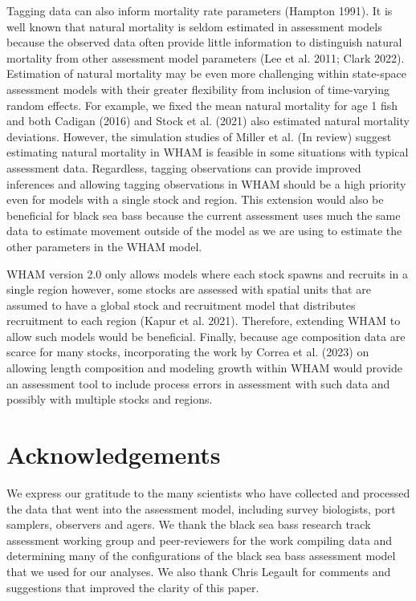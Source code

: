 \documentclass[
]{article}
\begin{document}
Tagging data can also inform mortality rate parameters (Hampton 1991). It is well known that natural mortality is seldom estimated in assessment models because the observed data often provide little information to distinguish natural mortality from other assessment model parameters (Lee et al. 2011; Clark 2022). Estimation of natural mortality may be even more challenging within state-space assessment models with their greater flexibility from inclusion of time-varying random effects. For example, we fixed the mean natural mortality for age 1 fish and both Cadigan (2016) and Stock et al. (2021) also estimated natural mortality deviations. However, the simulation studies of Miller et al. (In review) suggest estimating natural mortality in WHAM is feasible in some situations with typical assessment data. Regardless, tagging observations can provide improved inferences and allowing tagging observations in WHAM should be a high priority even for models with a single stock and region. This extension would also be beneficial for black sea bass because the current assessment uses much the same data to estimate movement outside of the model as we are using to estimate the other parameters in the WHAM model.

WHAM version 2.0 only allows models where each stock spawns and recruits in a single region however, some stocks are assessed with spatial units that are assumed to have a global stock and recruitment model that distributes recruitment to each region (Kapur et al. 2021). Therefore, extending WHAM to allow such models would be beneficial. Finally, because age composition data are scarce for many stocks, incorporating the work by Correa et al. (2023) on allowing length composition and modeling growth within WHAM would provide an assessment tool to include process errors in assessment with such data and possibly with multiple stocks and regions.

\hypertarget{acknowledgements}{%
\section{Acknowledgements}\label{acknowledgements}}

We express our gratitude to the many scientists who have collected and processed the data that went into the assessment model, including survey biologists, port samplers, observers and agers. We thank the black sea bass research track assessment working group and peer-reviewers for the work compiling data and determining many of the configurations of the black sea bass assessment model that we used for our analyses. We also thank Chris Legault for comments and suggestions that improved the clarity of this paper.
\end{document}
